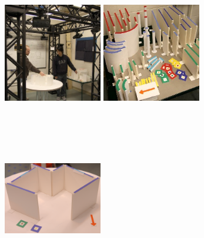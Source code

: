 \begin{figure}[t]
\newcommand{\figwidth}{1.7in}
\begin{center}
  \includegraphics[width=\figwidth]{josh_jonathan_new_contraption}
  \includegraphics[width=\figwidth]{available_wall_pieces}\vspace{-0.19in}\\
\begin{minipage}{\figwidth}~{\color{white}{\bf a)}}\end{minipage}
\begin{minipage}{\figwidth}~{\color{white}{\bf b)}}\end{minipage}\vspace{0.05in}\\
  \includegraphics[width=\figwidth]{sample_model}

\end{center}
\end{figure}
